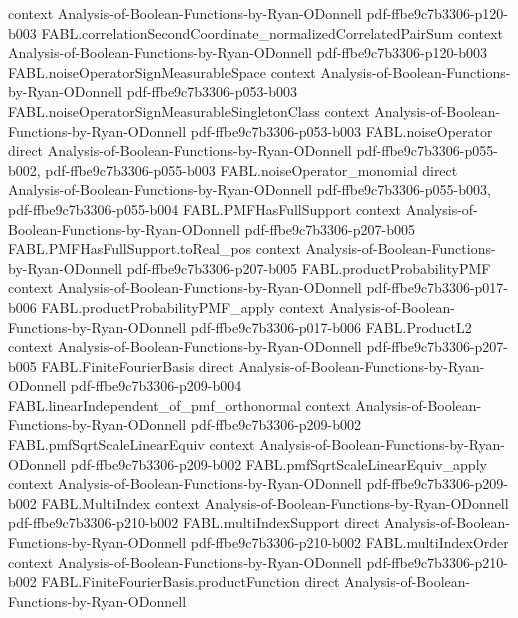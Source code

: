 \begin{theorem}
  {context}
  {Analysis-of-Boolean-Functions-by-Ryan-ODonnell}
  {pdf-ffbe9c7b3306-p120-b003}
\proofstep
  {FABL.correlationSecondCoordinate_normalizedCorrelatedPairSum}
  {context}
  {Analysis-of-Boolean-Functions-by-Ryan-ODonnell}
  {pdf-ffbe9c7b3306-p120-b003}
\proofstep
  {FABL.noiseOperatorSignMeasurableSpace}
  {context}
  {Analysis-of-Boolean-Functions-by-Ryan-ODonnell}
  {pdf-ffbe9c7b3306-p053-b003}
\proofstep
  {FABL.noiseOperatorSignMeasurableSingletonClass}
  {context}
  {Analysis-of-Boolean-Functions-by-Ryan-ODonnell}
  {pdf-ffbe9c7b3306-p053-b003}
\proofstep
  {FABL.noiseOperator}
  {direct}
  {Analysis-of-Boolean-Functions-by-Ryan-ODonnell}
  {pdf-ffbe9c7b3306-p055-b002,
    pdf-ffbe9c7b3306-p055-b003}
\proofstep
  {FABL.noiseOperator_monomial}
  {direct}
  {Analysis-of-Boolean-Functions-by-Ryan-ODonnell}
  {pdf-ffbe9c7b3306-p055-b003,
    pdf-ffbe9c7b3306-p055-b004}
\proofstep
  {FABL.PMFHasFullSupport}
  {context}
  {Analysis-of-Boolean-Functions-by-Ryan-ODonnell}
  {pdf-ffbe9c7b3306-p207-b005}
\proofstep
  {FABL.PMFHasFullSupport.toReal_pos}
  {context}
  {Analysis-of-Boolean-Functions-by-Ryan-ODonnell}
  {pdf-ffbe9c7b3306-p207-b005}
\proofstep
  {FABL.productProbabilityPMF}
  {context}
  {Analysis-of-Boolean-Functions-by-Ryan-ODonnell}
  {pdf-ffbe9c7b3306-p017-b006}
\proofstep
  {FABL.productProbabilityPMF_apply}
  {context}
  {Analysis-of-Boolean-Functions-by-Ryan-ODonnell}
  {pdf-ffbe9c7b3306-p017-b006}
\proofstep
  {FABL.ProductL2}
  {context}
  {Analysis-of-Boolean-Functions-by-Ryan-ODonnell}
  {pdf-ffbe9c7b3306-p207-b005}
\proofstep
  {FABL.FiniteFourierBasis}
  {direct}
  {Analysis-of-Boolean-Functions-by-Ryan-ODonnell}
  {pdf-ffbe9c7b3306-p209-b004}
\proofstep
  {FABL.linearIndependent_of_pmf_orthonormal}
  {context}
  {Analysis-of-Boolean-Functions-by-Ryan-ODonnell}
  {pdf-ffbe9c7b3306-p209-b002}
\proofstep
  {FABL.pmfSqrtScaleLinearEquiv}
  {context}
  {Analysis-of-Boolean-Functions-by-Ryan-ODonnell}
  {pdf-ffbe9c7b3306-p209-b002}
\proofstep
  {FABL.pmfSqrtScaleLinearEquiv_apply}
  {context}
  {Analysis-of-Boolean-Functions-by-Ryan-ODonnell}
  {pdf-ffbe9c7b3306-p209-b002}
\proofstep
  {FABL.MultiIndex}
  {context}
  {Analysis-of-Boolean-Functions-by-Ryan-ODonnell}
  {pdf-ffbe9c7b3306-p210-b002}
\proofstep
  {FABL.multiIndexSupport}
  {direct}
  {Analysis-of-Boolean-Functions-by-Ryan-ODonnell}
  {pdf-ffbe9c7b3306-p210-b002}
\proofstep
  {FABL.multiIndexOrder}
  {context}
  {Analysis-of-Boolean-Functions-by-Ryan-ODonnell}
  {pdf-ffbe9c7b3306-p210-b002}
\proofstep
  {FABL.FiniteFourierBasis.productFunction}
  {direct}
  {Analysis-of-Boolean-Functions-by-Ryan-ODonnell}

\end{theorem}
